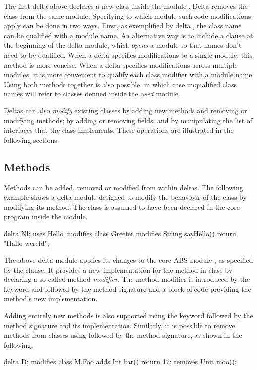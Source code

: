 The first delta  above declares a new class  inside the
module . Delta  removes the class  from the same
module.
Specifying to which module such code modifications apply can be done in two
ways. First, as exemplified by delta , the class name can be qualified with a module name.
An alternative way is to include a  clause at the
beginning of the delta module, which \emph{opens} a module so that names don't
need to be qualified. When a delta specifies modifications to a single module,
this method is more concise. When a delta specifies modifications across
multiple modules, it is more convenient to qualify each class modifier with a module
name. Using both methods together is also possible, in which case unqualified
class names will refer to classes defined inside the \emph{used} module.

Deltas can also \emph{modify} existing classes by adding new methods and
removing or modifying methods; by adding or removing fields; and by manipulating
the list of interfaces that the class implements. These operations are illustrated in the
following sections.

\subsection{Methods}
\label{sec:class methods}
Methods can be added, removed or modified from within deltas.
The following example shows a delta module designed to modify the behaviour of
the class  by modifying its  method.
The class is assumed to have been declared in the core program inside the
 module.

\begin{abscode}
delta Nl;
uses Hello;
modifies class Greeter {
    modifies String sayHello() {
        return "Hallo wereld";
    }
}
\end{abscode}
%
The above  delta module applies its changes to the core ABS module
, as specified by the  clause. It provides a new
implementation for the method  in class
 by declaring a so-called method \emph{modifier}. The method modifier
is introduced by the  keyword and followed by the method
signature and a block of code providing the method's new implementation.
 
Adding entirely new methods is also supported using the  keyword
followed by the method signature and its implementation.
Similarly, it is possible to remove methods from classes using
 followed by the method signature, as shown in the following.
\begin{abscode}
delta D;
modifies class M.Foo {
    adds Int bar() { return 17; }
    removes Unit moo();
}
\end{abscode}

